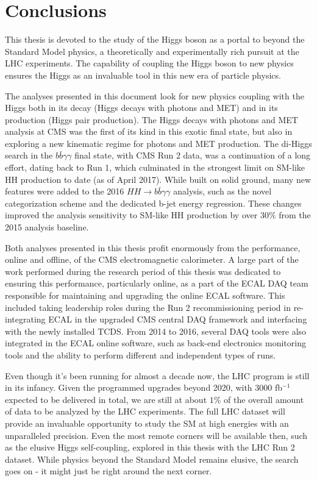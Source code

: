 \chapter{Conclusions}

This thesis is devoted to the study of the Higgs boson as a portal to beyond the Standard Model physics, a theoretically and experimentally rich pursuit at the LHC experiments.  
The capability of coupling the Higgs boson to new physics ensures the Higgs as an invaluable tool in this new era of particle physics.

The analyses presented in this document look for new physics coupling with the Higgs both in its decay (Higgs decays with photons and MET) and in its production (Higgs pair production).
The Higgs decays with photons and MET analysis at CMS was the first of its kind in this exotic final state, but also in exploring a new kinematic regime for photons and MET production. 
The di-Higgs search in the $b\bar{b}\gamma\gamma$ final state, with CMS Run 2 data, was a continuation of a long effort, dating back to Run 1, which culminated in the strongest limit on SM-like HH production to date (as of April 2017). 
While built on solid ground, many new features were added to the 2016 $HH\rightarrow b\bar{b}\gamma\gamma$ analysis, such as the novel categorization scheme and the dedicated b-jet energy regression. These changes improved the analysis sensitivity to SM-like HH production by over $30\%$ from the 2015 analysis baseline.

Both analyses presented in this thesis profit enormously from the performance, online and offline, of the CMS electromagnetic calorimeter. 
A large part of the work performed during the research period of this thesis was dedicated to ensuring this performance, particularly online, as a part of the ECAL DAQ team responsible for maintaining and upgrading the online ECAL software. 
This included taking leadership roles during the Run 2 recommissioning period in re-integrating ECAL in the upgraded CMS central DAQ framework and interfacing with the newly installed TCDS. 
From 2014 to 2016, several DAQ tools were also integrated in the ECAL online software, such as back-end electronics monitoring tools and the ability to perform different and independent types of runs. 

Even though it's been running for almost a decade now, the LHC program is still in its infancy. 
Given the programmed upgrades beyond 2020, with 3000 fb$^{-1}$ expected to be delivered in total, we are still at about $1\%$ of the overall amount of data to be analyzed by the LHC experiments. 
The full LHC dataset will provide an invaluable opportunity to study the SM at high energies with an unparalleled  precision. 
Even the most remote corners will be available then, such as the elusive Higgs self-coupling, explored in this thesis with the LHC Run 2 dataset. 
While physics beyond the Standard Model remains elusive, the search goes on - it might just be right around the next corner.

 